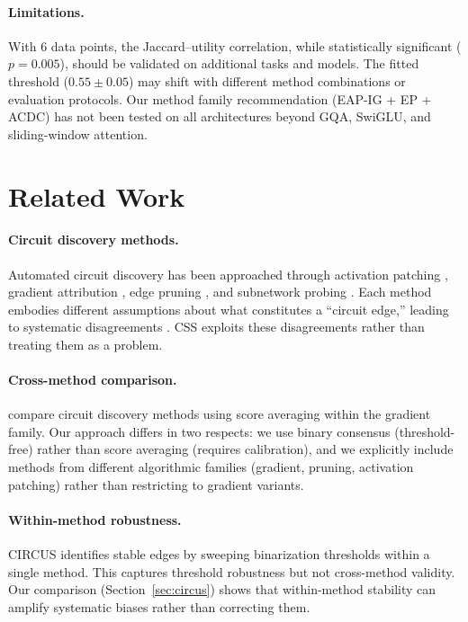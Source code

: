 \documentclass[11pt]{article}
\newcommand{\css}{\textsc{CSS}}
\begin{document}
\paragraph{Limitations.} With 6 data points, the Jaccard--utility correlation, while statistically significant ($p = 0.005$), should be validated on additional tasks and models. The fitted threshold ($0.55 \pm 0.05$) may shift with different method combinations or evaluation protocols. Our method family recommendation (EAP-IG + EP + ACDC) has not been tested on all architectures beyond GQA, SwiGLU, and sliding-window attention.

\section{Related Work}
\label{sec:related}

\paragraph{Circuit discovery methods.} Automated circuit discovery has been approached through activation patching \citep{conmy2023automated}, gradient attribution \citep{syed2023attribution}, edge pruning \citep{hanna2024have}, and subnetwork probing \citep{cao2021low}. Each method embodies different assumptions about what constitutes a ``circuit edge,'' leading to systematic disagreements \citep{mondorf2024beyond}. \css{} exploits these disagreements rather than treating them as a problem.

\paragraph{Cross-method comparison.} \citet{mondorf2024beyond} compare circuit discovery methods using score averaging within the gradient family. Our approach differs in two respects: we use binary consensus (threshold-free) rather than score averaging (requires calibration), and we explicitly include methods from different algorithmic families (gradient, pruning, activation patching) rather than restricting to gradient variants.

\paragraph{Within-method robustness.} CIRCUS \citep{parekh2026circus} identifies stable edges by sweeping binarization thresholds within a single method. This captures threshold robustness but not cross-method validity. Our comparison (Section~\ref{sec:circus}) shows that within-method stability can amplify systematic biases rather than correcting them.
\end{document}
